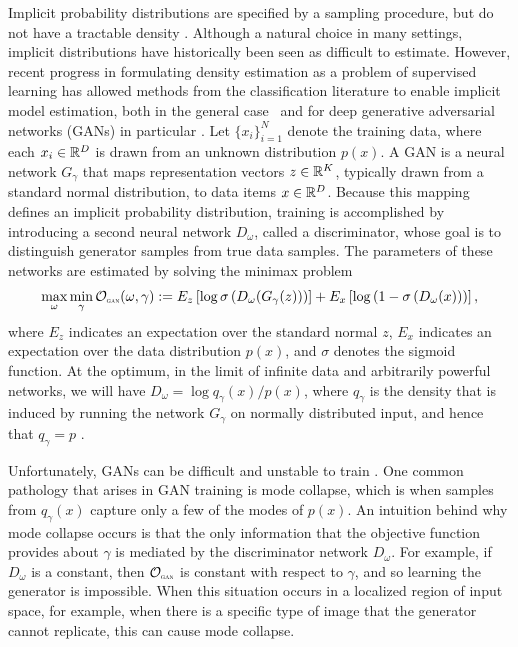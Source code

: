 \documentclass{article}
\newcommand{\Expb}[2]{{E}_{#1}\left[ #2 \right]}
\newcommand{\Ogan}{\mathcal{O}_{\mbox{\tiny\sc gan}}}
\begin{document}
Implicit probability distributions are  specified 
by a sampling procedure, but do not have a tractable density \cite{diggle:gratton}.
Although a natural choice in many settings, implicit distributions
have historically been seen as difficult to estimate. However, recent progress in formulating  density estimation  as a problem of supervised learning has allowed methods from the classification literature to enable implicit model estimation, both in the general case~\cite{Gutmann2014,1611.10242} and for deep generative adversarial networks (GANs) in particular \cite{gan}. Let $\{ x_i \}_{i=1}^N$ denote the training data, where each $x_i \in \mathbb{R}^D$ is drawn 
from an unknown distribution $p(x)$.
A GAN is a neural network
$G_\gamma$ that maps representation vectors $z \in \mathbb{R}^K$, typically 
 drawn from a standard normal distribution, to data items $x \in \mathbb{R}^D$. 
Because this mapping defines an implicit probability distribution, 
training is accomplished by introducing a second neural network
$D_\omega$, called a discriminator, 
whose goal is to distinguish generator samples from true data samples. The parameters of these  networks are estimated
by solving the minimax problem
\begin{equation*}
\max_\omega \min_\gamma \Ogan (\omega, \gamma) :=
 \Expb{z}{\log \sigma \left(D_\omega(G_\gamma (z))\right)}  + \Expb{x}{\log\left( 1-\sigma \left(D_\omega(x)\right)\right)},
\end{equation*}
where $E_z$ indicates an expectation over the standard normal $z$,
$E_x$ indicates an expectation over the data distribution $p(x)$, and
$\sigma$ denotes the sigmoid function. At the optimum, in the limit of
infinite data and arbitrarily powerful networks, we will have
$D_\omega = \log q_\gamma(x)/p(x)$, where $q_\gamma$ is the density
that is induced by running the network $G_\gamma$ on normally
distributed input, and hence that $q_\gamma = p$ \cite{gan}.

Unfortunately, GANs can be difficult and unstable to train \citep{salimans16improved}. One common pathology
that arises in GAN training is mode collapse, which is when
samples from $q_\gamma(x)$ capture only a few of the modes
of $p(x)$.
An intuition behind why mode collapse occurs
is that the only information that the objective function provides 
about $\gamma$ is mediated
by the discriminator network $D_\omega$. For example, if
$D_\omega$ is a constant, then $\Ogan$ is constant with respect to $\gamma$, and so learning the generator is impossible.
When this situation occurs in a localized region of input space,
for example, when there is a specific type of image that the
generator cannot replicate,
this can cause mode collapse.
\end{document}

